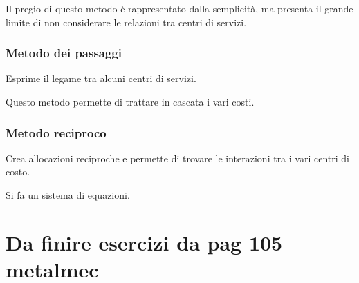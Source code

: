 Il pregio di questo metodo è rappresentato dalla semplicità, ma presenta
il grande limite di non considerare le relazioni tra centri di servizi.


\subsubsection{Metodo dei passaggi}
Esprime il legame tra alcuni centri di servizi.

Questo metodo permette di trattare in cascata i vari costi.

\subsubsection{Metodo reciproco}
Crea allocazioni reciproche e permette di trovare le interazioni tra i vari centri di costo.

Si fa un sistema di equazioni.

\section{Da finire esercizi da pag 105 metalmec}